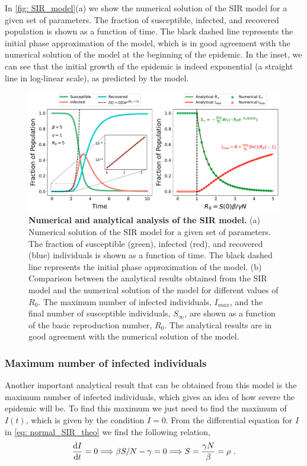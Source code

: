 In \cref{fig: SIR_model}(a) we show the numerical solution of the SIR model for
a given set of parameters. The fraction of susceptible, infected, and recovered
population is shown as a function of time. The black dashed line represents the
initial phase approximation of the model, which is in good agreement with the
numerical solution of the model at the beginning of the epidemic. In the inset,
we can see that the initial growth of the epidemic is indeed exponential
(a straight line in log-linear scale), as predicted by the model.

\begin{figure}[H]
  \centering
  \includegraphics[width=1\textwidth]{Figures/SIR_model_analysis.pdf}
  \caption[Numerical and analytical analysis of the SIR model.]{\label{fig:
      SIR_model} \textbf{Numerical and analytical analysis of the SIR model.}
    (a) Numerical solution of the SIR model for a given set of parameters. The
    fraction of susceptible (green), infected (red), and recovered (blue)
    individuals is shown as a function of time. The black dashed line
    represents the initial phase approximation of the model. (b) Comparison
    between the analytical results obtained from the SIR model and the
    numerical solution of the model for different values of $R_0$. The maximum
    number of infected individuals, $I_{max}$, and the final number of
    susceptible individuals, $S_{\infty}$, are shown as a function of the basic
    reproduction number, $R_0$. The analytical results are in good agreement
    with the numerical solution of the model.
  }
\end{figure}

\subsubsection*{Maximum number of infected individuals}

Another important analytical result that can be obtained from this model is
the maximum number of infected individuals, which gives an idea of how severe
the epidemic will be. To find this maximum we just need to find the maximum of
$I(t)$, which is given by the condition $\dot{I}=0$. From the differential
equation for $I$ in \cref{eq: normal_SIR_theo} we find the following relation,
\begin{equation}
  \frac{\mathrm{d} I}{\mathrm{d} t}=0\Longrightarrow\beta S/N-\gamma=0\Longrightarrow
  S=\frac{\gamma N}{\beta}=\rho \ .
\end{equation}

